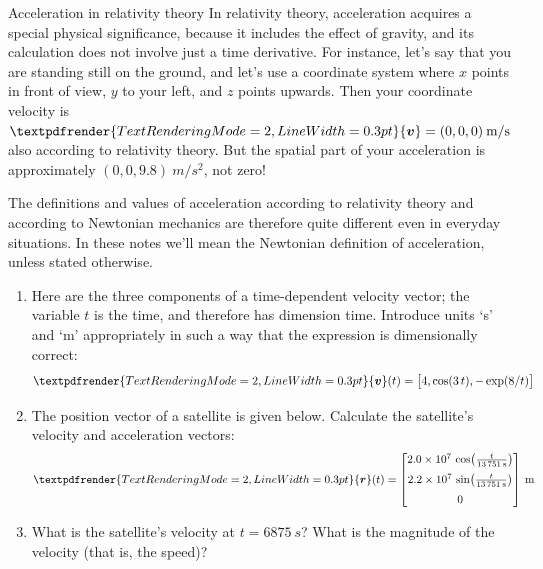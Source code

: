 \documentclass[a4paper,12pt,%
onecolumn,oneside,titlepage,%
british%
]{memoir}
\renewcommand*{\bm}[1]{\textpdfrender{TextRenderingMode=2,LineWidth=0.3pt}{\boldsymbol{#1}}}
\renewcommand*{\|}[1][]{\nonscript\:#1\vert\nonscript\:\mathopen{}}
\newcommand*{\yr}{\bm{r}}
\newcommand*{\yv}{\bm{v}}
\begin{document}
\begin{extra}{Acceleration in relativity theory}
  In relativity theory, acceleration acquires a special physical significance, because it includes the effect of gravity, and its calculation does not involve just a time derivative. For instance, let's say that you are standing still on the ground, and let's use a coordinate system where $x$ points in front of view, $y$ to your left, and $z$ points upwards. Then your coordinate velocity is $\yv=(0,0,0)\:\unit{m/s}$ also according to relativity theory. But the spatial part of your acceleration is approximately $(0,0,9.8)\:\unit{m/s^{2}}$, not zero!

  The definitions and values of acceleration according to relativity theory and according to Newtonian mechanics are therefore quite different even in everyday situations. In these notes we'll mean the Newtonian definition of acceleration, unless stated otherwise.
\end{extra}

\medskip

\begin{exercise}
  \begin{enumerate}[shift,label=\bfseries\arabic*.]
  \item Here are the three components of a time-dependent velocity vector; the variable $t$ is the time, and therefore has dimension \textsf{time}. Introduce units \enquote*{\unit{s}} and \enquote*{\unit{m}} appropriately in such a way that the expression is dimensionally correct:
    \begin{equation*}
      \bm{v}(t) = \bigl[4, \cos(3\,t), -\exp(8/t)\bigr]
    \end{equation*}
  \item The position vector of a satellite is given below. Calculate the satellite's velocity and acceleration vectors:
    \begin{equation*}
      \yr(t) =
      \begin{bmatrix}
        \num[exponent-mode=scientific]{20e+6}\,
        \cos\bigl(\frac{t}{\qty{13751}{s}}\bigr)\\[2\jot]
        \num[exponent-mode=scientific]{22e+6}\,
        \sin\bigl(\frac{t}{\qty{13751}{s}}\bigr)\\[2\jot]
        \num{0}
      \end{bmatrix}\:\unit{m}
    \end{equation*}
  \item What is the satellite's velocity at $t=\qty{6875}{s}$? What is the magnitude of the velocity (that is, the speed)?
  \end{enumerate}
  
\end{exercise}
\end{document}

